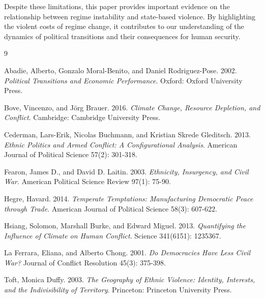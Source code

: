 \documentclass[12pt]{article}
\begin{document}
Despite these limitations, this paper provides important evidence on the relationship between regime instability and state-based violence. By highlighting the violent costs of regime change, it contributes to our understanding of the dynamics of political transitions and their consequences for human security.


\begin{thebibliography}{9}

 Abadie, Alberto, Gonzalo Moral-Benito, and Daniel Rodriguez-Pose. 2002. \textit{Political Transitions and Economic Performance}. Oxford: Oxford University Press.

 Bove, Vincenzo, and J\"org Brauer. 2016. \textit{Climate Change, Resource Depletion, and Conflict}. Cambridge: Cambridge University Press.

 Cederman, Lars-Erik, Nicolas Buchmann, and Kristian Skrede Gleditsch. 2013. \textit{Ethnic Politics and Armed Conflict: A Configurational Analysis}. American Journal of Political Science 57(2): 301-318.

 Fearon, James D., and David D. Laitin. 2003. \textit{Ethnicity, Insurgency, and Civil War}. American Political Science Review 97(1): 75-90.

 Hegre, Havard. 2014. \textit{Temperate Temptations: Manufacturing Democratic Peace through Trade}. American Journal of Political Science 58(3): 607-622.

 Hsiang, Solomon, Marshall Burke, and Edward Miguel. 2013. \textit{Quantifying the Influence of Climate on Human Conflict}. Science 341(6151): 1235367.

 La Ferrara, Eliana, and Alberto Chong. 2001. \textit{Do Democracies Have Less Civil War?} Journal of Conflict Resolution 45(3): 375-398.

 Toft, Monica Duffy. 2003. \textit{The Geography of Ethnic Violence: Identity, Interests, and the Indivisibility of Territory}. Princeton: Princeton University Press.

\end{thebibliography}
\end{document}
